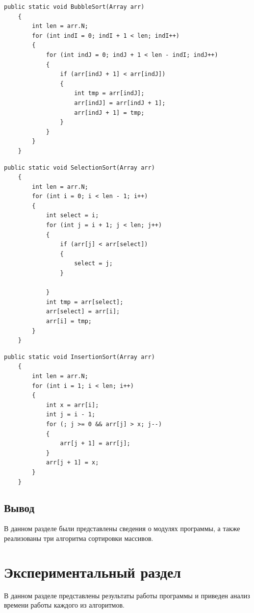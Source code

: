 \documentclass[14pt, a4paper]{extarticle}
\begin{document}
\begin{lstlisting}[label=BubleSort,caption=Алгоритм сортировки пузырьком]
	public static void BubbleSort(Array arr)
	{
		int len = arr.N;
		for (int indI = 0; indI + 1 < len; indI++)
		{
			for (int indJ = 0; indJ + 1 < len - indI; indJ++)
			{
				if (arr[indJ + 1] < arr[indJ])
				{ 
					int tmp = arr[indJ];
					arr[indJ] = arr[indJ + 1];
					arr[indJ + 1] = tmp;
				}
			}
		}
	}
\end{lstlisting}

\begin{lstlisting}[label=SelectionSort,caption=Алгоритм сортировки выбором]
	public static void SelectionSort(Array arr)
	{
		int len = arr.N;
		for (int i = 0; i < len - 1; i++)
		{
			int select = i;
			for (int j = i + 1; j < len; j++)
			{
				if (arr[j] < arr[select])
				{
					select = j;
				}
				
			}
			int tmp = arr[select];
			arr[select] = arr[i];
			arr[i] = tmp;
		}
	}
\end{lstlisting}

\begin{lstlisting}[label=InsertionSort,caption=Алгоритм сортировки вставками]
	public static void InsertionSort(Array arr)
	{
		int len = arr.N;
		for (int i = 1; i < len; i++)
		{
			int x = arr[i];
			int j = i - 1;
			for (; j >= 0 && arr[j] > x; j--)
			{
				arr[j + 1] = arr[j];
			}
			arr[j + 1] = x;
		}
	}
\end{lstlisting}

\subsection{Вывод}
В данном разделе были представлены сведения о модулях программы, а также реализованы три алгоритма сортировки массивов.

\clearpage
\section{Экспериментальный раздел}
В данном разделе представлены результаты работы программы и приведен анализ времени работы каждого из алгоритмов.
\end{document}

